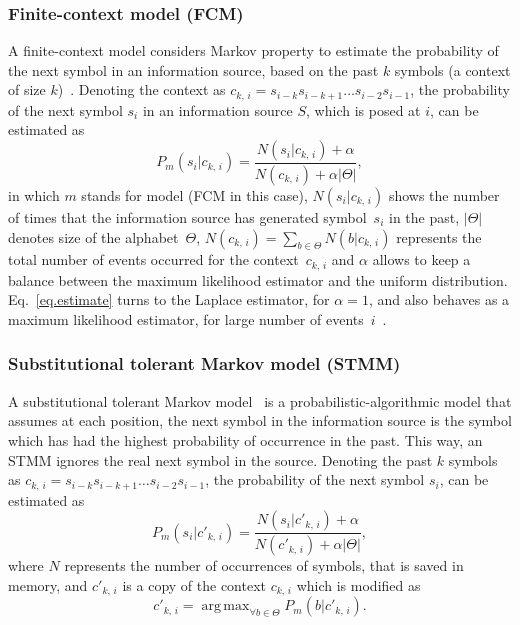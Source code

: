 \documentclass[a4paper,num-refs]{oup-contemporary}
\begin{document}
\subsubsection*{Finite-context model (FCM)}
A finite-context model considers Markov property to estimate the probability of the next symbol in an information source, based on the past $k$ symbols (a context of size $k$)~\cite{sayood2017introduction,hosseini2019ac,pinho2013mfcompress}. Denoting the context as $c_{k,\,i} = s_{i-k} s_{i-k+1}\ldots s_{i-2} s_{i-1}$, the probability of the next symbol $s_i$ in an information source $S$, which is posed at $i$, can be estimated as
\begin{equation} \label{eq.estimate}
  P_m(s_i|c_{k,\,i}) = \frac{N(s_i|c_{k,\,i})+\alpha}{N(c_{k,\,i})+ \alpha|\Theta|},
\end{equation}
in which $m$ stands for model (FCM in this case), $N(s_i|c_{k,\,i})$ shows the number of times that the information source has generated symbol~$s_i$ in the past, $|\Theta|$ denotes size of the alphabet~$\Theta$, $N(c_{k,\,i}) = \sum_{b \in \Theta} N(b|c_{k,\,i})$ represents the total number of events occurred for the context~$c_{k,\,i}$ and $\alpha$ allows to keep a balance between the maximum likelihood estimator and the uniform distribution. Eq.~\ref{eq.estimate} turns to the Laplace estimator, for $\alpha=1$, and also behaves as a maximum likelihood estimator, for large number of events~$i$~\cite{pratas2015alignment}.

 \subsubsection*{Substitutional tolerant Markov model (STMM)}
 A substitutional tolerant Markov model~\cite{pratas2017substitutional} is a probabilistic-algorithmic model that assumes at each position, the next symbol in the information source is the symbol which has had the highest probability of occurrence in the past. This way, an STMM ignores the real next symbol in the source. Denoting the past $k$ symbols as $c_{k,\,i} = s_{i-k} s_{i-k+1}\ldots s_{i-2} s_{i-1}$, the probability of the next symbol $s_i$, can be estimated as
 \begin{equation}
   P_m(s_i|{c'}_{k,\,i}) = \frac{N(s_i|{c'}_{k,\,i})+\alpha}{N({c'}_{k,\,i})+ \alpha|\Theta|},
 \end{equation}
 where $N$ represents the number of occurrences of symbols, that is saved in memory, and ${c'}_{k,\,i}$ is a copy of the context $c_{k,\,i}$ which is modified as
 \begin{equation}
   {c'}_{k,\,i} = \mathop{\mathrm{arg\,max}}_{\forall b\in \Theta}{P_m(b|{c'}_{k,\,i})}.
 \end{equation}
\end{document}
